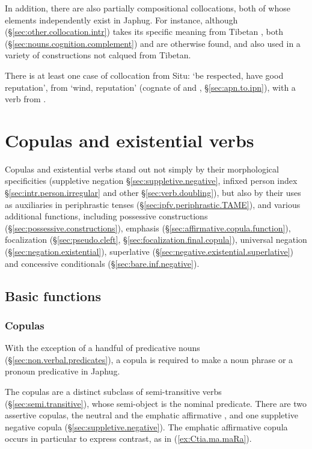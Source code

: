 In addition, there are also partially compositional collocations, both of whose elements independently exist in Japhug. For instance, although  (§\ref{sec:other.collocation.intr}) takes its specific meaning from Tibetan , both  (§\ref{sec:nouns.cognition.complement}) and  are otherwise found, and also used in a variety of constructions not calqued from Tibetan.

There is at least one case of collocation from Situ:  `be respected, have good reputation', from  `wind, reputation' (cognate of  and , §\ref{sec:apn.to.ipn}), with a verb from .
 
\section{Copulas and existential verbs}  \label{sec:copula.existential}
Copulas and existential verbs stand out not simply by their morphological specificities (suppletive negation §\ref{sec:suppletive.negative}, infixed person index §\ref{sec:intr.person.irregular} and other §\ref{sec:verb.doubling}), but also by their uses as auxiliaries in periphrastic tenses (§\ref{sec:ipfv.periphrastic.TAME}), and various additional functions, including possessive constructions (§\ref{sec:possessive.constructions}), emphasis (§\ref{sec:affirmative.copula.function}), focalization (§\ref{sec:pseudo.cleft}, §\ref{sec:focalization.final.copula}), universal negation (§\ref{sec:negation.existential}), superlative (§\ref{sec:negative.existential.superlative}) and concessive conditionals (§\ref{sec:bare.inf.negative}). 

\subsection{Basic functions}  
\subsubsection{Copulas} \label{sec:copula.basic}
With the exception of a handful of predicative nouns (§\ref{sec:non.verbal.predicates}), a copula is required to make a noun phrase or a pronoun predicative in Japhug.
 
The copulas are a distinct subclass of semi-transitive verbs (§\ref{sec:semi.transitive}), whose semi-object is the nominal predicate. There are two assertive copulas, the neutral  and the emphatic affirmative , and one suppletive negative copula  (§\ref{sec:suppletive.negative}). The emphatic affirmative copula occurs in particular to express contrast, as in (\ref{ex:Ctia.ma.maRa}).

